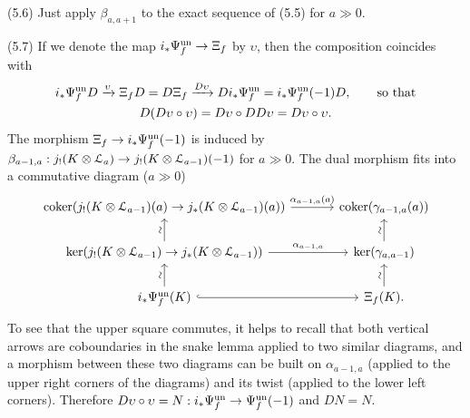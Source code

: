 \documentclass[deligne.tex]{subfiles}
\begin{document}
(5.6) Just apply $\beta_{a,a+1}$ to the exact sequence of (5.5) for $a\gg0$.

(5.7) If we denote the map $i_*\Psi_f^{\mathrm{un}}\rightarrow\Xi_f$ by $\upsilon$,
then the composition coincides with
\begin{gather*}
	i_*\Psi_f^{\mathrm{un}}D\xrightarrow\upsilon\Xi_fD=D\Xi_f\xrightarrow{D\upsilon}Di_*\Psi_f^{\mathrm{un}}=i_*\Psi_f^{\mathrm{un}}(-1)D,\qquad\text{so that}\\
	D(D\upsilon\circ\upsilon)=D\upsilon\circ DD\upsilon=D\upsilon\circ\upsilon.
\end{gather*}
The morphism $\Xi_f\rightarrow i_*\Psi_f^{\mathrm{un}}(-1)$ is
induced by
$\beta_{a-1,a}:j_!(K\otimes\mathcal L_a)\rightarrow j_!(K\otimes\mathcal L_{a-1})(-1)$
for $a\gg0$.
The dual morphism fits into a commutative diagram ($a\gg0$)
\begin{equation*}\begin{tikzcd}
	\coker(j_!(K\otimes\mathcal L_{a-1})(a)\ra j_*(K\otimes\mathcal L_{a-1})(a))\arrow[r,"\alpha_{a-1,a}(a)"]
	&[10pt]\coker(\gamma_{a-1,a}(a)) \\
	\ker(j_!(K\otimes\mathcal L_{a-1})\ra j_*(K\otimes\mathcal L_{a-1}))
	\arrow[u,"\rsim"]\arrow[r,"\alpha_{a-1,a}"]
	&\ker(\gamma_{a,a-1})\arrow[u,"\rsim"] \\
	i_*\Psi_f^{\mathrm{un}}(K)\arrow[u,"\rsim"]\arrow[r,hook]
	&\Xi_f(K).\arrow[u,"\rsim"]
\end{tikzcd}\end{equation*}
To see that the upper square commutes, it helps to recall that both
vertical arrows are coboundaries in the snake lemma applied to two similar
diagrams, and a morphism between these two diagrams can be built on
$\alpha_{a-1,a}$ (applied to the upper right corners of the diagrams) and
its twist (applied to the lower left corners).
Therefore
$D\upsilon\circ\upsilon=N:i_*\Psi_f^{\mathrm{un}}\rightarrow\Psi_f^{\mathrm{un}}(-1)$ 
and $DN=N$.
\end{document}
